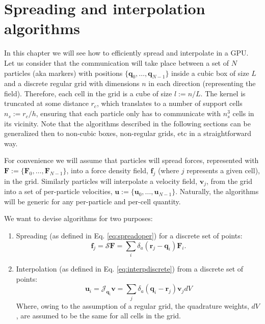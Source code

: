 \documentclass[twoside,openright,titlepage,numbers=noenddot,%
headinclude,footinclude,cleardoublepage=empty,abstract=on,
BCOR=5mm,fontsize=11pt, dvipsnames, paper=b5
]{scrreprt}
\renewcommand{\vec}[1]{\bm{#1}}
\newcommand{\oper}[1]{\mathcal{#1}}
\newcommand{\gpu}{\gls{GPU}\xspace}
\newcommand{\ppos}{q}
\newcommand{\pvel}{u}
\newcommand{\fpos}{r}
\newcommand{\fvel}{v}
\begin{document}
\section{Spreading and interpolation algorithms}
In this chapter we will see how to efficiently spread and interpolate in a \gpu.
Let us consider that the communication will take place between a set of $N$ particles (aka markers) with positions $\{\vec{\ppos}_0,\dots,\vec{\ppos}_{N-1}\}$ inside a cubic box of size $L$ and a discrete regular grid with dimensions $n$ in each direction (representing the field). Therefore, each cell in the grid is a cube of size $l := n/L$. The kernel is truncated at some distance $r_c$, which translates to a number of support cells $n_s:=r_c/h$, ensuring that each particle only has to communicate with $n_s^3$ cells in its vicinity. Note that the algorithms described in the following sections can be generalized then to non-cubic boxes, non-regular grids, etc in a straightforward way.

For convenience we will assume that particles will spread forces, represented with $\vec{F}:=\{\vec{F}_0,\dots,\vec{F}_{N-1}\}$, into a force density field, $\vec{f}_j$ (where $j$ represents a given cell), in the grid. Similarly particles will interpolate a velocity field, $\vec{\fvel}_j$, from the grid into a set of per-particle velocities, $\vec{\pvel}:=\{\vec{\pvel}_0,\dots,\vec{\pvel}_{N-1}\}$. Naturally, the algorithms will be generic for any per-particle and per-cell quantity.

We want to devise algorithms for two purposes:
\begin{enumerate}
\item Spreading (as defined in Eq. \eqref{eq:spreadoper}) for a discrete set of points:
  \begin{equation}
    \vec{f}_j = \oper{S}\vec{F} = \sum_i \delta_a(\vec{\fpos}_j-\vec{\ppos}_i) \vec{F}_i.
  \end{equation}
\item Interpolation (as defined in Eq. \eqref{eq:interpdiscrete}) from a discrete set of points:
  \begin{equation}
    \label{eq:interpdiscrete}
    \vec{u}_i = \oper{J}_{\vec{\ppos}_i}\vec{\fvel} = \sum_j{\delta_a(\vec{\ppos}_i - \vec{\fpos}_j)\vec{\fvel}_jdV}
  \end{equation}
  Where, owing to the assumption of a regular grid, the quadrature weights, $dV$, are assumed to be the same for all cells in the grid.
\end{enumerate}
\end{document}

